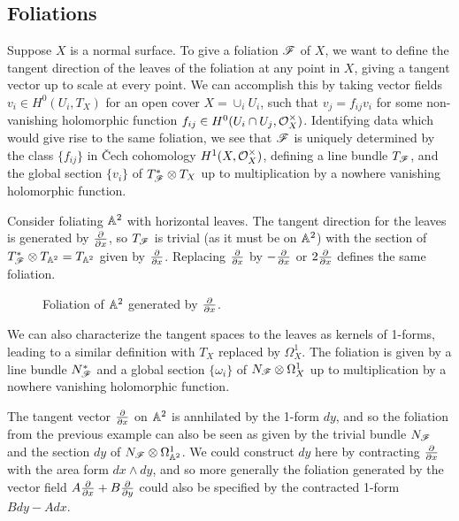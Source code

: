

\subsection{Foliations}

Suppose $X$ is a normal surface. To give a foliation $\mathscr{F}$ of $X$, we want to
define the tangent direction of the leaves of the foliation at any point in $X$,
giving a tangent vector up to scale at every point. We can accomplish this by
taking vector fields $v_i\in H^0(U_i,T_X)$ for an open cover $X=\cup_iU_i$, such
that $v_j=f_{ij}v_i$ for some non-vanishing holomorphic function
$f_{ij}\in H^0(U_i\cap U_j,\mathcal{O}_X^\times)$. Identifying data which would give rise
to the same foliation, we see that $\mathscr{F}$ is uniquely determined by the class
$\{f_{ij}\}$ in \v{C}ech cohomology $H^1(X,\mathcal{O}_X^\times)$, defining a line bundle
$T_{\mathscr{F}}$, and the global section $\{v_i\}$ of $T_{\mathscr{F}}^*\otimes T_X$ up to
multiplication by a nowhere vanishing holomorphic function.

\begin{example}
    Consider foliating $\mathbb{A}^2$ with horizontal leaves. The tangent direction for
    the leaves is generated by $\pdv{}{x}$, so $T_{\mathscr{F}}$ is trivial (as it must
    be on $\mathbb{A}^2$) with the section of $T_{\mathscr{F}}^*\otimes T_{\mathbb{A}^2}=T_{\mathbb{A}^2}$ given
    by $\pdv{}{x}$. Replacing $\pdv{}{x}$ by $-\pdv{}{x}$ or $2\pdv{}{x}$
    defines the same foliation.
    \begin{figure}[H]
        \centering
        \caption{Foliation of $\mathbb{A}^2$ generated by $\pdv{}{x}$.}
    \end{figure}
\end{example}

We can also characterize the tangent spaces to the leaves as kernels of 1-forms,
leading to a similar definition with $T_X$ replaced by $\Omega^1_X$. The
foliation is given by a line bundle $N_{\mathscr{F}}^*$ and a global section
$\{\omega_i\}$ of $N_{\mathscr{F}}\otimes\Omega^1_X$ up to multiplication by a nowhere
vanishing holomorphic function.

\begin{example}
    The tangent vector $\pdv{}{x}$ on $\mathbb{A}^2$ is annhilated by the 1-form $dy$,
    and so the foliation from the previous example can also be seen as given by
    the trivial bundle $N_{\mathscr{F}}$ and the section $dy$ of
    $N_{\mathscr{F}}\otimes\Omega^1_{\mathbb{A}^2}$. We could construct $dy$ here by contracting
    $\pdv{}{x}$ with the area form $dx\wedge dy$, and so more generally the
    foliation generated by the vector field $A\pdv{}{x}+B\pdv{}{y}$ could also
    be specified by the contracted 1-form $Bdy-Adx$.
\end{example}

